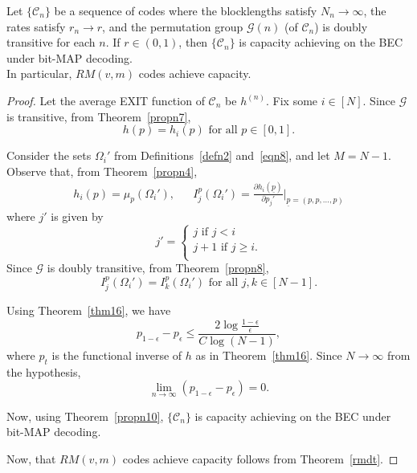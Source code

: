 \documentclass[
10pt, %
a4paper, %
oneside, %
headinclude,footinclude, %
BCOR5mm, %
]{scrartcl}
\begin{document}
\begin{theorem}
Let $\{\mathcal{C}_n\}$ be a sequence of codes where the blocklengths satisfy $N_n \to \infty$, the rates satisfy $r_n \to r$, and the permutation group $\mathcal{G}(n)$ (of $\mathcal{C}_n$) is doubly transitive for each $n$. If $r \in (0,1)$, then $\{\mathcal{C}_n\}$ is capacity achieving on the BEC under bit-MAP decoding.\\
In particular, $RM(v,m)$ codes achieve capacity.
\end{theorem}
\begin{proof}
Let the average EXIT function of $\mathcal{C}_n$ be $h^{(n)}$. Fix some $i \in [N]$. Since $\mathcal{G}$ is transitive, from Theorem~\ref{propn7}, $$h(p) = h_i(p) \text{ for all } p \in [0,1].$$

Consider the sets $\Omega_i'$ from Definitions~\ref{defn2} and~\ref{eqn8}, and let $M=N-1$. Observe that, from Theorem~\ref{propn4},
\begin{align*}
h_i(p) = \mu_p(\Omega_i'), &&I_j^{p}(\Omega_i') = \frac{\partial h_i(\underline{p})}{\partial p_j'}\Bigg|_{\underline{p}=(p,p,\ldots,p)}
\end{align*}
where $j'$ is given by 
\[
    j'=\left\{
                \begin{array}{ll}
                  j \text{ if } j < i\\
                  j+1 \text{ if } j \ge i.\\
                \end{array}
              \right.
  \]
Since $\mathcal{G}$ is doubly transitive, from Theorem~\ref{propn8}, $$I_j^{p}(\Omega_i') = I_k^{p}(\Omega_i') \text{ for all } j,k \in [N-1].$$

Using Theorem~\ref{thm16}, we have $$p_{1-\epsilon} - p_\epsilon \le \frac{2 \log \frac{1-\epsilon}{\epsilon}}{C\log (N-1)},$$ where $p_t$ is the functional inverse of $h$ as in Theorem~\ref{thm16}. Since $N \to \infty$ from the hypothesis, $$\lim_{n \to \infty} (p_{1-\epsilon} - p_\epsilon) = 0.$$

Now, using Theorem~\ref{propn10}, $\{\mathcal{C}_n\}$ is capacity achieving on the BEC under bit-MAP decoding.

Now, that $RM(v,m)$ codes achieve capacity follows from Theorem~\ref{rmdt}.
\end{proof}
\end{document}
